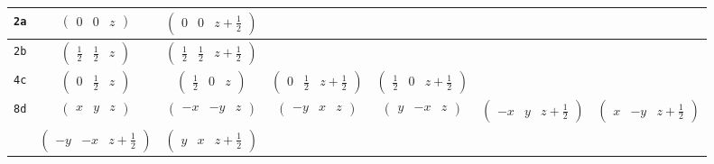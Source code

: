 \documentclass[fleqn,9pt,landscape]{jsarticle}
\begin{document}
\begin{center}
\begin{longtable}{ccccccc}
{\tt 2a} & $ \begin{pmatrix} 0 & 0 & z \end{pmatrix} $ & $ \begin{pmatrix} 0 & 0 & z + \frac{1}{2} \end{pmatrix} $ & $  $ & $  $ & $  $ & $  $ \\ \hline
{\tt 2b} & $ \begin{pmatrix} \frac{1}{2} & \frac{1}{2} & z \end{pmatrix} $ & $ \begin{pmatrix} \frac{1}{2} & \frac{1}{2} & z + \frac{1}{2} \end{pmatrix} $ & $  $ & $  $ & $  $ & $  $ \\ \hline
{\tt 4c} & $ \begin{pmatrix} 0 & \frac{1}{2} & z \end{pmatrix} $ & $ \begin{pmatrix} \frac{1}{2} & 0 & z \end{pmatrix} $ & $ \begin{pmatrix} 0 & \frac{1}{2} & z + \frac{1}{2} \end{pmatrix} $ & $ \begin{pmatrix} \frac{1}{2} & 0 & z + \frac{1}{2} \end{pmatrix} $ & $  $ & $  $ \\ \hline
{\tt 8d} & $ \begin{pmatrix} x & y & z \end{pmatrix} $ & $ \begin{pmatrix} - x & - y & z \end{pmatrix} $ & $ \begin{pmatrix} - y & x & z \end{pmatrix} $ & $ \begin{pmatrix} y & - x & z \end{pmatrix} $ & $ \begin{pmatrix} - x & y & z + \frac{1}{2} \end{pmatrix} $ & $ \begin{pmatrix} x & - y & z + \frac{1}{2} \end{pmatrix} $ \\
& $ \begin{pmatrix} - y & - x & z + \frac{1}{2} \end{pmatrix} $ & $ \begin{pmatrix} y & x & z + \frac{1}{2} \end{pmatrix} $ & $  $ & $  $ & $  $ & $  $ \\
\end{longtable}
\end{center}
\end{document}
